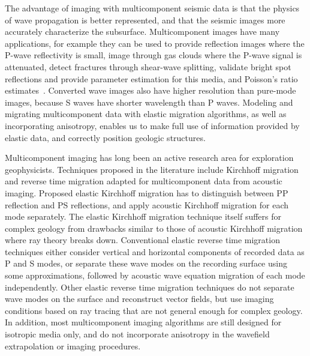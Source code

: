           
% 
The advantage of imaging with multicomponent seismic data is that the physics of wave propagation is better represented, and that the seismic images more accurately characterize the subsurface. Multicomponent images have many applications, for example they can be used to provide reflection images where the P-wave reflectivity is small, image through gas clouds where the P-wave signal is attenuated, detect fractures through shear-wave splitting, validate bright spot reflections and provide parameter estimation for this media, and Poisson's ratio estimates~\cite[]{simmons:1227}. 
Converted wave images also have higher resolution than pure-mode images, because S waves have shorter wavelength than P waves. 
Modeling and migrating multicomponent data with elastic migration algorithms, as well as incorporating anisotropy, enables us to make full use of information provided by elastic data, and correctly position geologic structures.



Multicomponent imaging has long been an active research area for exploration geophysicists. Techniques proposed in the literature include Kirchhoff migration and reverse time migration adapted for multicomponent data from acoustic imaging. Proposed elastic Kirchhoff migration has to distinguish between PP reflection and PS reflections, and apply acoustic Kirchhoff migration for each mode separately. The elastic Kirchhoff migration technique itself suffers for complex geology from drawbacks similar to those of acoustic Kirchhoff migration where ray theory breaks down. Conventional elastic reverse time migration techniques either consider vertical and horizontal components of recorded data as P and S modes, or separate these wave modes on the recording surface using some approximations, followed by acoustic wave equation migration of each mode independently. Other elastic reverse time migration techniques do not separate wave modes on the surface and reconstruct vector fields, but use imaging conditions based on ray tracing that are not general enough for complex geology. In addition, most multicomponent imaging algorithms are still designed for isotropic media only, and do not incorporate anisotropy in the wavefield extrapolation or imaging procedures.


